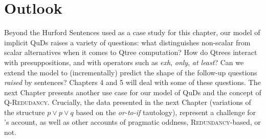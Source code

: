 \begin{exe}
	\ex 
	\begin{xlist}
		\label{ex:ldhd-s-w}
		\label{ex:ldhd-w-s}
	\end{xlist}
\end{exe}



\section{Outlook}

Beyond the Hurford Sentences used as a case study for this chapter, our model of implicit QuDs raises a variety of questions: what distinguishes non-scalar from scalar alternatives when it comes to Qtree computation? How do Qtrees interact with presuppositions, and with operators such as \textit{exh}, \textit{only}, \textit{at least}? Can we extend the model to (incrementally) predict the shape of the follow-up questions \textit{raised} by sentences? Chapters 4 and 5 will deal with some of these questions. The next Chapter presents another use case for our model of QuDs and the concept of \textsc{Q-Redudancy}. Crucially, the data presented in the next Chapter (variations of the structure $p \vee p \vee q$ based on the \textit{or-to-if} tautology), represent a challenge for \citeauthor{Kalomoiros2024}'s account, as well as other accounts of pragmatic oddness, \textsc{Redundancy}-based, or not.



